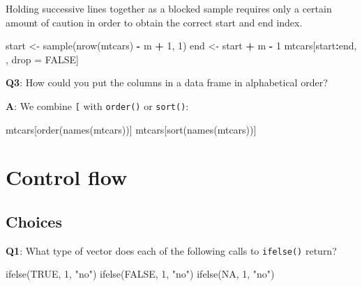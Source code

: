\documentclass[
]{krantz}
\makeatletter
\newenvironment{Shaded}{\begin{snugshade}}{\end{snugshade}}
\newcommand{\DecValTok}[1]{\textcolor[rgb]{0.00,0.00,0.81}{#1}}
\newcommand{\KeywordTok}[1]{\textcolor[rgb]{0.13,0.29,0.53}{\textbf{#1}}}
\newcommand{\NormalTok}[1]{#1}
\newcommand{\OperatorTok}[1]{\textcolor[rgb]{0.81,0.36,0.00}{\textbf{#1}}}
\newcommand{\OtherTok}[1]{\textcolor[rgb]{0.56,0.35,0.01}{#1}}
\newcommand{\StringTok}[1]{\textcolor[rgb]{0.31,0.60,0.02}{#1}}
\newenvironment{kframe}{%
\medskip{}
\setlength{\fboxsep}{.8em}
 \def\at@end@of@kframe{}%
 \ifinner\ifhmode%
  \def\at@end@of@kframe{\end{minipage}}%
  \begin{minipage}{\columnwidth}%
 \fi\fi%
 \def\FrameCommand##1{\hskip\@totalleftmargin \hskip-\fboxsep
 \colorbox{shadecolor}{##1}\hskip-\fboxsep
     \hskip-\linewidth \hskip-\@totalleftmargin \hskip\columnwidth}%
 \MakeFramed {\advance\hsize-\width
   \@totalleftmargin\z@ \linewidth\hsize
   \@setminipage}}%
 {\par\unskip\endMakeFramed%
 \at@end@of@kframe}
\renewenvironment{Shaded}{\begin{kframe}}{\end{kframe}}
\renewcommand{\KeywordTok} [1]{\textcolor[rgb]{0.00,0.44,0.13}{{#1}}}
\renewcommand{\DecValTok}  [1]{\textcolor[rgb]{0.25,0.63,0.44}{{#1}}}
\renewcommand{\StringTok}  [1]{\textcolor[rgb]{0.25,0.44,0.63}{{#1}}}
\renewcommand{\OtherTok}   [1]{\textcolor[rgb]{0.00,0.44,0.13}{{#1}}}
\renewcommand{\NormalTok}  [1]{{#1}}
\makeatother
\begin{document}
Holding successive lines together as a blocked sample requires only a certain amount of caution in order to obtain the correct start and end index.

\begin{Shaded}
\begin{Highlighting}[]
\NormalTok{start <-}\StringTok{ }\KeywordTok{sample}\NormalTok{(}\KeywordTok{nrow}\NormalTok{(mtcars) }\OperatorTok{-}\StringTok{ }\NormalTok{m }\OperatorTok{+}\StringTok{ }\DecValTok{1}\NormalTok{, }\DecValTok{1}\NormalTok{)}
\NormalTok{end <-}\StringTok{ }\NormalTok{start }\OperatorTok{+}\StringTok{ }\NormalTok{m }\OperatorTok{-}\StringTok{ }\DecValTok{1}
\NormalTok{mtcars[start}\OperatorTok{:}\NormalTok{end, , drop =}\StringTok{ }\OtherTok{FALSE}\NormalTok{]}
\end{Highlighting}
\end{Shaded}

\textbf{{Q3}}: How could you put the columns in a data frame in alphabetical order?

\textbf{{A}}: We combine \texttt{{[}} with \texttt{order()} or \texttt{sort()}:

\begin{Shaded}
\begin{Highlighting}[]
\NormalTok{mtcars[}\KeywordTok{order}\NormalTok{(}\KeywordTok{names}\NormalTok{(mtcars))]}
\NormalTok{mtcars[}\KeywordTok{sort}\NormalTok{(}\KeywordTok{names}\NormalTok{(mtcars))]}
\end{Highlighting}
\end{Shaded}

\hypertarget{control-flow}{%
\chapter{Control flow}\label{control-flow}}


\hypertarget{choices}{%
\section{Choices}\label{choices}}

\textbf{{Q1}}: What type of vector does each of the following calls to \texttt{ifelse()} return?

\begin{Shaded}
\begin{Highlighting}[]
\KeywordTok{ifelse}\NormalTok{(}\OtherTok{TRUE}\NormalTok{, }\DecValTok{1}\NormalTok{, }\StringTok{"no"}\NormalTok{)}
\KeywordTok{ifelse}\NormalTok{(}\OtherTok{FALSE}\NormalTok{, }\DecValTok{1}\NormalTok{, }\StringTok{"no"}\NormalTok{)}
\KeywordTok{ifelse}\NormalTok{(}\OtherTok{NA}\NormalTok{, }\DecValTok{1}\NormalTok{, }\StringTok{"no"}\NormalTok{)}
\end{Highlighting}
\end{Shaded}
\end{document}
